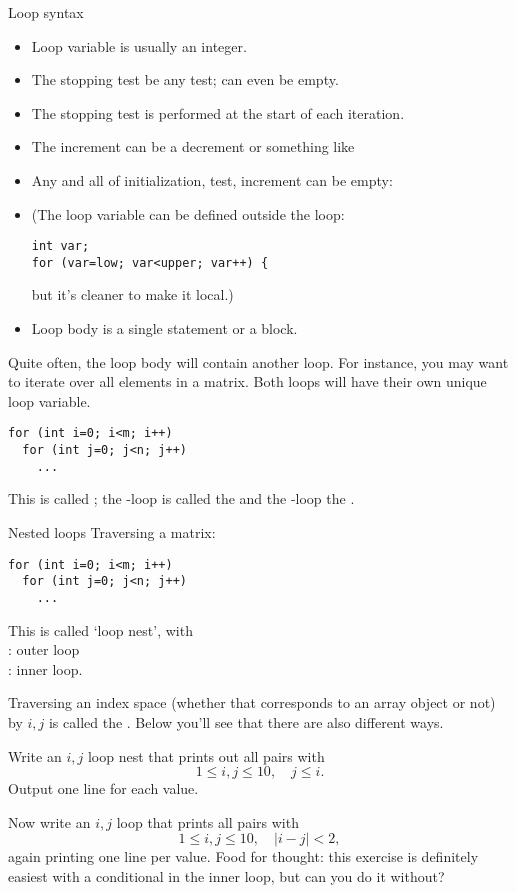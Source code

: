 \begin{slide}{Loop syntax}
  \label{sl:for-syntax}
  \begin{itemize}
  \item Loop variable is usually an integer.
  \item The stopping test be any test; can even be empty.
  \item The stopping test is performed at the start of each iteration.
  \item The increment can be a decrement or something like 
  \item Any and all of initialization, test, increment can be empty:\\
  \item (The loop variable can be defined outside the loop:
\begin{lstlisting}
int var;
for (var=low; var<upper; var++) {
\end{lstlisting}
but it's cleaner to make it local.)
\item Loop body is a single statement or a block.
  \end{itemize}
\end{slide}

Quite often, the loop body will contain another loop. For instance,
you may want to iterate over all elements in a matrix. Both loops will
have their own unique loop variable.
\begin{lstlisting}
for (int i=0; i<m; i++)
  for (int j=0; j<n; j++)
    ...
\end{lstlisting}
This is called ; 
the -loop is called the  and the
-loop the .

\begin{slide}{Nested loops}
  \label{sl:for-nest}
  Traversing a matrix:
\begin{lstlisting}
for (int i=0; i<m; i++)
  for (int j=0; j<n; j++)
    ...
\end{lstlisting}
This is called `loop nest', with\\
: outer loop\\
: inner loop.
\end{slide}

Traversing an index space (whether that corresponds to an array object
or not) by $i,j$ is called the .
Below you'll see that there are also different
ways.

\begin{exercise}
  \label{ex:ij-triangle}
  Write an $i,j$ loop nest that prints out all pairs with
  \[ 1\leq i,j\leq 10,\quad  j\leq i. \]
  Output one line for each  value.

  Now write an $i,j$ loop that prints all pairs with
  \[ 1\leq i,j\leq 10,\quad |i-j|<2, \]
  again printing one line per  value.
  Food for thought: this exercise is definitely easiest with a
  conditional in the inner loop, but can you do
  it without? 
\end{exercise}

